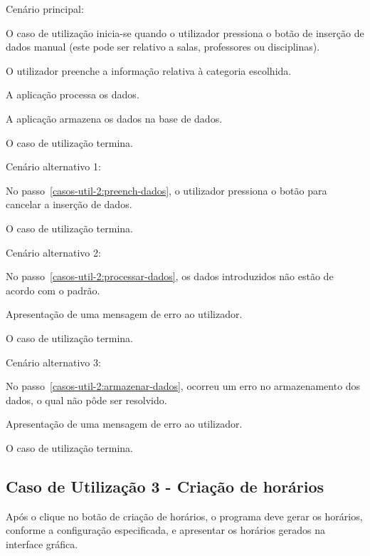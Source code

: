 Cenário principal:

\begin{compactenum}
    \item O caso de utilização inicia-se quando o utilizador pressiona o botão de inserção de dados manual (este pode ser relativo a salas, professores ou disciplinas).
    \item O utilizador preenche a informação relativa à categoria escolhida. \label{casos-util-2:preench-dados}
    \item A aplicação processa os dados. \label{casos-util-2:processar-dados}
    \item A aplicação armazena os dados na base de dados. \label{casos-util-2:armazenar-dados}
    \item O caso de utilização termina.
\end{compactenum}

Cenário alternativo 1:

\begin{compactenum}
    \item No passo~\ref{casos-util-2:preench-dados}, o utilizador pressiona o botão para cancelar a inserção de dados.
    \item O caso de utilização termina.
\end{compactenum}

Cenário alternativo 2:

\begin{compactenum}
    \item No passo~\ref{casos-util-2:processar-dados}, os dados introduzidos não estão de acordo com o padrão.
    \item Apresentação de uma mensagem de erro ao utilizador.
    \item O caso de utilização termina.
\end{compactenum}

Cenário alternativo 3:

\begin{compactenum}
    \item No passo~\ref{casos-util-2:armazenar-dados}, ocorreu um erro no armazenamento dos dados, o qual não pôde ser resolvido.
    \item Apresentação de uma mensagem de erro ao utilizador.
    \item O caso de utilização termina.
\end{compactenum}

\subsection*{Caso de Utilização 3 - Criação de horários}
Após o clique no botão de criação de horários, o programa deve gerar os horários, conforme a configuração especificada, e apresentar os horários gerados na interface gráfica.

